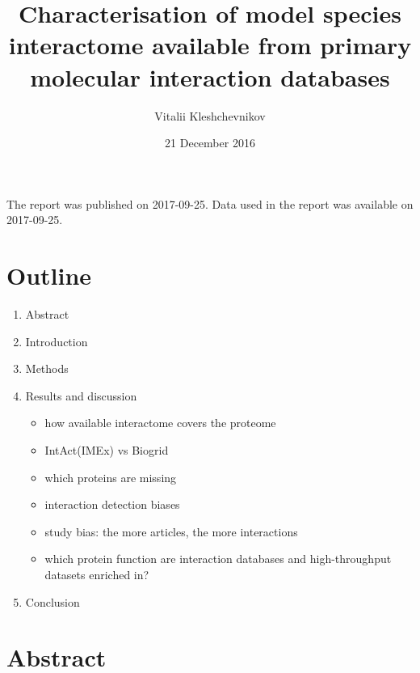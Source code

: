 \documentclass[12pt,]{report}
\title{Characterisation of model species interactome available from primary
molecular interaction databases}
\author{Vitalii Kleshchevnikov}
\date{21 December 2016}
\providecommand{\tightlist}{%
  \setlength{\itemsep}{0pt}\setlength{\parskip}{0pt}}
\begin{document}
\maketitle

{
\setcounter{tocdepth}{1}
\tableofcontents
}
The report was published on 2017-09-25. Data used in the report was
available on 2017-09-25.

\chapter{Outline}\label{outline}

\begin{enumerate}
\def\labelenumi{\arabic{enumi}.}
\tightlist
\item
  Abstract
\item
  Introduction
\item
  Methods
\item
  Results and discussion

  \begin{itemize}
  \tightlist
  \item
    how available interactome covers the proteome
  \item
    IntAct(IMEx) vs Biogrid
  \item
    which proteins are missing
  \item
    interaction detection biases
  \item
    study bias: the more articles, the more interactions
  \item
    which protein function are interaction databases and high-throughput
    datasets enriched in?
  \end{itemize}
\item
  Conclusion
\end{enumerate}

\chapter{Abstract}\label{abstract}
\end{document}
